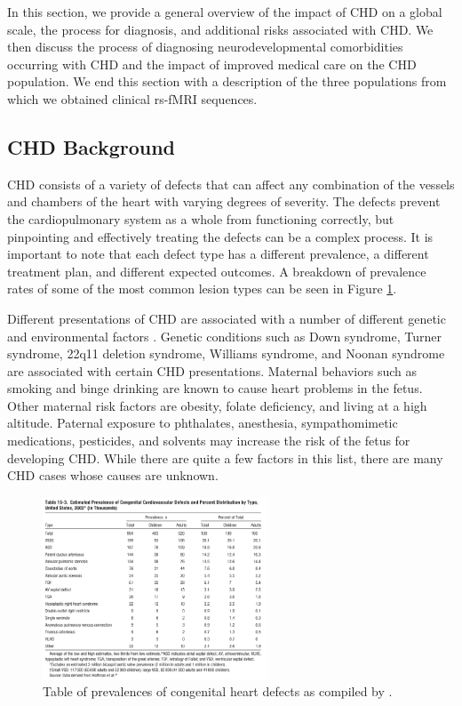 In this section, we provide a general overview of the impact of CHD on a global scale, the process for diagnosis, and additional risks associated with CHD. We then discuss the process of diagnosing neurodevelopmental comorbidities occurring with CHD and the impact of improved medical care on the CHD population. We end this section with a description of the three populations from which we obtained clinical rs-fMRI sequences.


\subsection{CHD Background}

CHD consists of a variety of defects that can affect any combination of the vessels and chambers of the heart with varying degrees of severity. The defects prevent the cardiopulmonary system as a whole from functioning correctly, but pinpointing and effectively treating the defects can be a complex process. It is important to note that each defect type has a different prevalence, a different treatment plan, and different expected outcomes. A breakdown of prevalence rates of some of the most common lesion types can be seen in Figure \ref{ch5:fig:usa-defects-prev}. 

Different presentations of CHD are associated with a number of different genetic and environmental factors \cite{Mozaffarian2016}. Genetic conditions such as Down syndrome, Turner syndrome, 22q11 deletion syndrome, Williams syndrome, and Noonan syndrome are associated with certain CHD presentations. Maternal behaviors such as smoking and binge drinking are known to cause heart problems in the fetus. Other maternal risk factors are obesity, folate deficiency, and living at a high altitude. Paternal exposure to phthalates, anesthesia, sympathomimetic medications, pesticides, and solvents may increase the risk of the fetus for developing CHD. While there are quite a few factors in this list, there are many CHD cases whose causes are unknown.

\begin{figure}
\centering
\includegraphics[width=0.6\textwidth]{5/chd-defects-usa.png}
\caption{Table of prevalences of congenital heart defects as compiled by \cite{Mozaffarian2016}.}
\label{ch5:fig:usa-defects-prev}
\end{figure}

